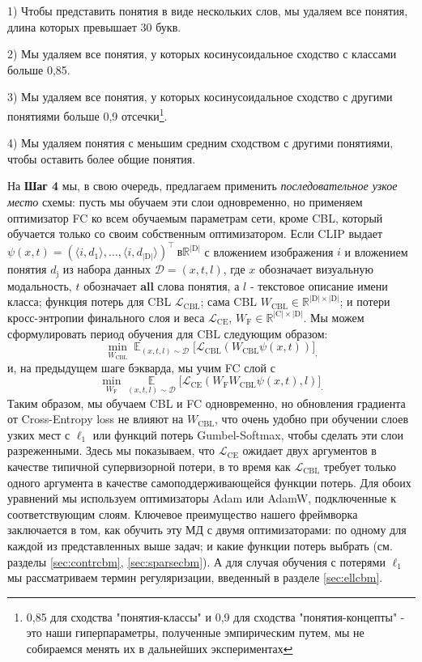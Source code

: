 1) Чтобы представить понятия в виде нескольких слов, мы удаляем все понятия, длина которых превышает 30 букв.

2) Мы удаляем все понятия, у которых косинусоидальное сходство с классами больше 0,85.

3) Мы удаляем все понятия, у которых косинусоидальное сходство с другими понятиями больше 0,9 отсечки\footnote{0,85 для сходства "понятия-классы" и 0,9 для сходства "понятия-концепты" - это наши гиперпараметры, полученные эмпирическим путем, мы не собираемся менять их в дальнейших экспериментах}.

4) Мы удаляем понятия с меньшим средним сходством с другими понятиями, чтобы оставить более общие понятия. 

На \textbf{Шаг 4} мы, в свою очередь, предлагаем применить \textit{последовательное узкое место} схемы: пусть мы обучаем эти слои одновременно, но применяем оптимизатор FC ко всем обучаемым параметрам сети, кроме CBL, который обучается только со своим собственным оптимизатором. Если CLIP выдает $\psi(x, t) = \left(\langle i, d_1\rangle,\dots,\langle i, d_{|\mathrm{D}|}\rangle \right)^{\mathrm{\top}} \ в \mathbb{R}^{|\mathrm{D}|}$ с вложением изображения $i$ и вложением понятия $d_{\mathrm{j}}$ из набора данных $\mathcal{D} = (x, t, l)$, где $x$ обозначает визуальную модальность, $t$ обозначает \textbf{all} слова понятия, а $l$ - текстовое описание имени класса; функция потерь для CBL $\mathcal{L}_{\mathrm{CBL}}$; сама CBL $W_{\mathrm{CBL}}\in\mathbb{R}^{|\mathrm{D}|\times|\mathrm{D}|}$; и потери кросс-энтропии финального слоя и веса $\mathcal{L}_{\mathrm{CE}}$, $W_{\mathrm{F}}\in\mathbb{R}^{|\mathrm{C}|\times |\mathrm{D}|}$. Мы можем сформулировать период обучения для CBL следующим образом:
\[
\min \limits_{W_{\mathrm{CBL}}}\mathop{\mathbb{E}}_{(x, t, l)\sim\mathcal{D}}\big[\mathcal{L}_{\mathrm{CBL}}(W_{\mathrm{CBL}}\psi(x, t))\big]_,
\] и, на предыдущем шаге бэкварда, мы учим FC слой с
\[
\min \limits_{W_{\mathrm{F}}} \mathop{\mathbb{E}}\limits_{(x, t, l)\sim\mathcal{D}}\big[\mathcal{L}_{\mathrm{CE}}(W_{\mathrm{F}}W_{\mathrm{CBL}}\psi(x, t), l) \big]_.
\]
Таким образом, мы обучаем CBL и FC одновременно, но обновления градиента от Cross-Entropy loss не влияют на $W_{\mathrm{CBL}}$, что очень удобно при обучении слоев узких мест с $\ell_1$ или функций потерь Gumbel-Softmax, чтобы сделать эти слои разреженными. %
Здесь мы показываем, что $\mathcal{L}_{\mathrm{CE}}$ ожидает двух аргументов в качестве типичной супервизорной потери, в то время как $\mathcal{L}_{\mathrm{CBL}}$ требует только одного аргумента в качестве самоподдерживающейся функции потерь. Для обоих уравнений мы используем оптимизаторы Adam или AdamW, подключенные к соответствующим слоям. Ключевое преимущество нашего фреймворка заключается в том, как обучить эту МД с двумя оптимизаторами: по одному для каждой из представленных выше задач; и какие функции потерь выбрать (см. разделы \ref{sec:contrcbm}, \ref{sec:sparsecbm}). А для случая обучения с потерями $\ell_1$ мы рассматриваем термин регуляризации, введенный в разделе \ref{sec:ellcbm}.

